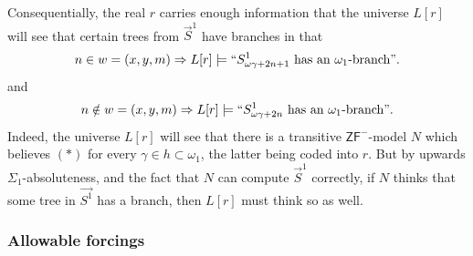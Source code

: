 \documentclass[a4paper,11pt]{article}
\newcommand{\ZFP}{\mathsf{ZF}^-}
\begin{document}
Consequentially, the real $r$ carries enough information that
the universe $L[r]$ will see that certain trees from $\vec{S}^1$ have branches in that
\begin{align*}
n \in w=(x,y,m) \Rightarrow L[r] \models  ``S^1_{\omega \gamma + 2n+1} \text{ has an $\omega_1$-branch}".
\end{align*}
and
\begin{align*}
n \notin w=(x,y,m) \Rightarrow L[r] \models ``S^1_{\omega \gamma + 2n} \text{ has an $\omega_1$-branch}".
\end{align*}
Indeed, the universe $L[r]$ will see that there is a transitive $\ZFP$-model $N$ which believes $(\ast)$ for every $\gamma \in h \subset \omega_1$, the latter being coded into $r$. But by upwards $\Sigma_1$-absoluteness, and the fact that $N$ can compute $\vec{S}^1$ correctly, if $N$ thinks that some tree in $\vec{S^1}$ has a branch, then $L[r]$ must think so as well.


\subsubsection{Allowable forcings}
\end{document}
